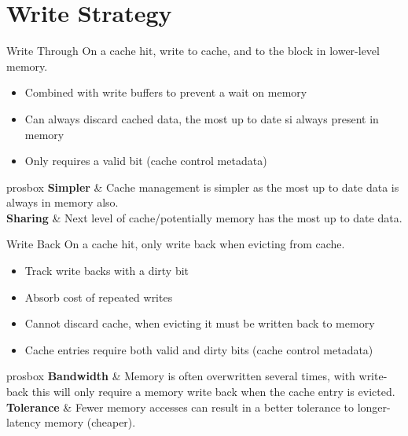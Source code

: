 \section{Write Strategy}
\begin{definitionbox}{Write Through}
	On a cache hit, write to cache, and to the block in lower-level memory.
	\begin{itemize}
		\item Combined with write buffers to prevent a wait on memory
		\item Can always discard cached data, the most up to date si always present in memory
		\item Only requires a valid bit (cache control metadata)
	\end{itemize}
	\begin{tabbox}{prosbox}
		\textbf{Simpler} & Cache management is simpler as the most up to date data is always in memory also. \\
		\textbf{Sharing} & Next level of cache/potentially memory has the most up to date data. \\
	\end{tabbox}
\end{definitionbox}
\begin{definitionbox}{Write Back}
	On a cache hit, only write back when evicting from cache.
	\begin{itemize}
		\item Track write backs with a dirty bit
		\item Absorb cost of repeated writes
		\item Cannot discard cache, when evicting it must be written back to memory
		\item Cache entries require both valid and dirty bits (cache control metadata)
	\end{itemize}
	\begin{tabbox}{prosbox}
		\textbf{Bandwidth} & Memory is often overwritten several times, with write-back this will only require a memory write back when the cache entry is evicted. \\
		\textbf{Tolerance} & Fewer memory accesses can result in a better tolerance to longer-latency memory (cheaper). \\
	\end{tabbox}
\end{definitionbox}

